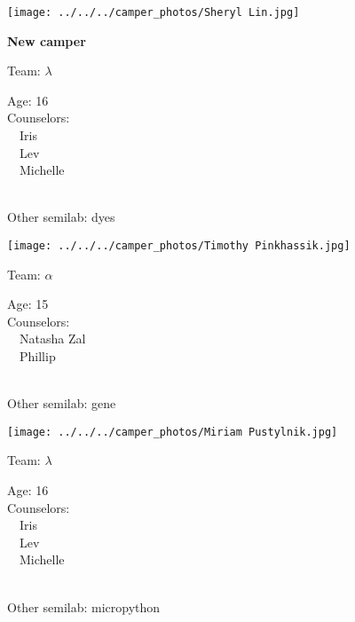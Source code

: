 \documentclass[10pt,letterpaper, landscape]{article}
\begin{document}
\horizontalshiftfornextsticker
\renewcommand{\baselinestretch}{1} \begin{sticker}
\noindent\begin{minipage}{0.5\textwidth}\texttt{[image: ../../../camper\_photos/Sheryl Lin.jpg]}\end{minipage}\begin{minipage}{0.45\textwidth}
\textbf{New camper} 

Team: {\Large $\lambda$}

Age:        16\\
Counselors: \\\ \ Iris\\\ \ Lev\\\ \ Michelle\\
\end{minipage} \\ \vspace{0.07in}
Other semilab: dyes
\end{sticker}
\horizontalshiftfornextsticker
\renewcommand{\baselinestretch}{1} \begin{sticker}
\noindent\begin{minipage}{0.5\textwidth}\texttt{[image: ../../../camper\_photos/Timothy Pinkhassik.jpg]}\end{minipage}\begin{minipage}{0.45\textwidth}
Team: {\Large $\alpha$}

Age:        15\\
Counselors: \\\ \ Natasha Zal\\\ \ Phillip\\
\end{minipage} \\ \vspace{0.07in}
Other semilab: gene
\end{sticker}
\horizontalshiftfornextsticker
\renewcommand{\baselinestretch}{1} \begin{sticker}
\noindent\begin{minipage}{0.5\textwidth}\texttt{[image: ../../../camper\_photos/Miriam Pustylnik.jpg]}\end{minipage}\begin{minipage}{0.45\textwidth}
Team: {\Large $\lambda$}

Age:        16\\
Counselors: \\\ \ Iris\\\ \ Lev\\\ \ Michelle\\
\end{minipage} \\ \vspace{0.07in}
Other semilab: micropython
\end{sticker}
\end{document}
